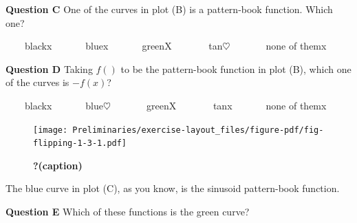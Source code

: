 \documentclass[
  letterpaper,
  DIV=11,
  numbers=noendperiod,
  oneside]{article}
\begin{document}
\begin{multicols}{2}
\begin{table}
\begin{minipage}[t]{\linewidth}
{\centering 

\textbf{Question C} One of the curves in plot (B) is a pattern-book
function. Which one?

~~~~{black{x}}~~~~~~~{blue{x}}~~~~~~~{green{︎X
}}~~~~~~~{tan{\(\heartsuit\ \)}}~~~~~~~{none of them{x}}

}

\end{minipage}%
\newline
\begin{minipage}[t]{\linewidth}

{\centering 

\textbf{Question D} Taking \(f()\) to be the pattern-book function in
plot (B), which one of the curves is \(-f(x)\)?

~~~~{black{x}}~~~~~~~{blue{\(\heartsuit\ \)}}~~~~~~~{green{︎X
}}~~~~~~~{tan{x}}~~~~~~~{none of them{x}}

}

\end{minipage}%
\newline
\begin{minipage}[t]{\linewidth}

{\centering 

\begin{figure}

{\centering \texttt{[image: Preliminaries/exercise-layout\_files/figure-pdf/fig-flipping-1-3-1.pdf]}

}

\caption{\label{fig-flipping-1-3}\textbf{?(caption)}}

\end{figure}

}

\end{minipage}%
\newline
\begin{minipage}[t]{\linewidth}

{\centering 

The blue curve in plot (C), as you know, is the sinusoid pattern-book
function.

}

\end{minipage}%
\newline
\begin{minipage}[t]{\linewidth}

{\centering 

\textbf{Question E} Which of these functions is the green curve?

}
\end{minipage}
\end{table}
\end{multicols}
\end{document}
